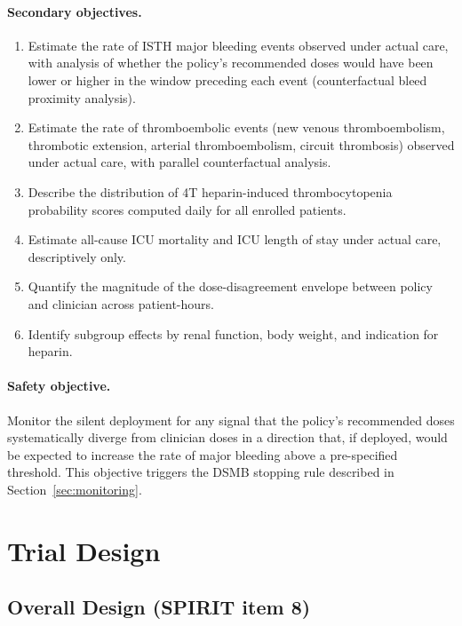 \documentclass[11pt]{article}
\begin{document}
\paragraph{Secondary objectives.}
\begin{enumerate}
  \item Estimate the rate of ISTH major bleeding events \citep{schulman2005} observed under actual care, with analysis of whether the policy's recommended doses would have been lower or higher in the window preceding each event (counterfactual bleed proximity analysis).
  \item Estimate the rate of thromboembolic events (new venous thromboembolism, thrombotic extension, arterial thromboembolism, circuit thrombosis) observed under actual care, with parallel counterfactual analysis.
  \item Describe the distribution of 4T heparin-induced thrombocytopenia probability scores \citep{lo2006} computed daily for all enrolled patients.
  \item Estimate all-cause ICU mortality and ICU length of stay under actual care, descriptively only.
  \item Quantify the magnitude of the dose-disagreement envelope between policy and clinician across patient-hours.
  \item Identify subgroup effects by renal function, body weight, and indication for heparin.
\end{enumerate}

\paragraph{Safety objective.} Monitor the silent deployment for any signal that the policy's recommended doses systematically diverge from clinician doses in a direction that, if deployed, would be expected to increase the rate of major bleeding above a pre-specified threshold. This objective triggers the DSMB stopping rule described in Section~\ref{sec:monitoring}.

\section{Trial Design}
\label{sec:design}

\subsection{Overall Design (SPIRIT item 8)}
\end{document}
